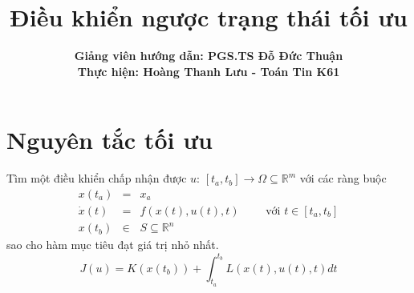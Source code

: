 \documentclass[11pt]{beamer}
\begin{document}
	\author[Hoàng Thanh Lưu (Toán Tin K61)]{\textbf{Giảng viên hướng dẫn: PGS.TS Đỗ Đức Thuận\\
			Thực hiện: Hoàng Thanh Lưu - Toán Tin K61}}
	\title{\textbf{Điều khiển ngược trạng thái tối ưu}}
	\begin{frame}[plain]
		\maketitle
	\end{frame}
\begin{frame}
	\tableofcontents
\end{frame}

	\section{Nguyên tắc tối ưu}

\begin{frame}
	Tìm một điều khiển chấp nhận được $u$: $[t_a, t_b] \to \Omega \subseteq \mathbb{R}^m$ với các ràng buộc 
	\begin{eqnarray}
	x(t_a) &=& x_a \nonumber \\ \dot{x}(t) &=& f(x(t), u(t), t) \qquad \text{ với } t \in [t_a, t_b] \nonumber \\ x(t_b)&\in& S \subseteq \mathbb{R}^n \nonumber
	\end{eqnarray} 
	sao cho hàm mục tiêu đạt giá trị nhỏ nhất.
	\begin{equation}
		J(u) = K(x(t_b)) + \int_{t_a}^{t_b}L(x(t),u(t), t)dt
	\end{equation} 
	
\end{frame}
\end{document}
